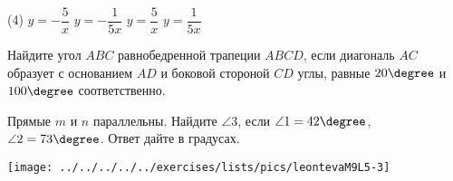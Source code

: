 \begin{class}[number=6]
\begin{listofex}
\begin{figure}[!h]
{		}
		\end{figure}
		
		\begin{tasks}(4)
			\task \( y=-\dfrac{5}{x} \)
			\task \( y=-\dfrac{1}{5x} \)
			\task \( y=\dfrac{5}{x} \)
			\task \( y=\dfrac{1}{5x} \)
		\end{tasks}
		\item Найдите угол \( ABC \) равнобедренной трапеции \( ABCD \), если диагональ \( AC \) образует с основанием \( AD \) и боковой стороной \( CD \) углы, равные \( 20\degree \) и \( 100\degree \) соответственно.
		
		\item 
		\begin{minipage}[t]{\bodywidth}
			Прямые \( m \) и \( n \) параллельны. Найдите \( \angle 3 \), если \( \angle 1 = 42\degree \), \( \angle 2 = 73\degree \). Ответ дайте в градусах.
		\end{minipage}
		\hspace{0.02\linewidth}
		\begin{minipage}[t]{\picwidth}
			\texttt{[image: ../../../../../exercises/lists/pics/leontevaM9L5-3]}
		\end{minipage}
		
	\end{listofex}
\end{class}

